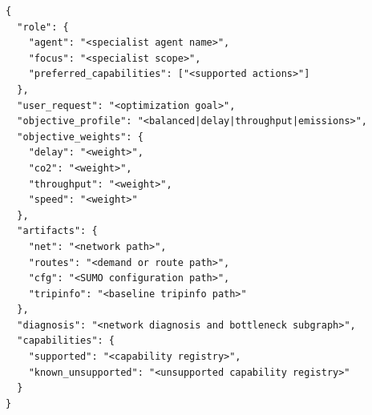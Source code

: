 \begin{lstlisting}[style=llmprompt]
{
  "role": {
    "agent": "<specialist agent name>",
    "focus": "<specialist scope>",
    "preferred_capabilities": ["<supported actions>"]
  },
  "user_request": "<optimization goal>",
  "objective_profile": "<balanced|delay|throughput|emissions>",
  "objective_weights": {
    "delay": "<weight>",
    "co2": "<weight>",
    "throughput": "<weight>",
    "speed": "<weight>"
  },
  "artifacts": {
    "net": "<network path>",
    "routes": "<demand or route path>",
    "cfg": "<SUMO configuration path>",
    "tripinfo": "<baseline tripinfo path>"
  },
  "diagnosis": "<network diagnosis and bottleneck subgraph>",
  "capabilities": {
    "supported": "<capability registry>",
    "known_unsupported": "<unsupported capability registry>"
  }
}
\end{lstlisting}
